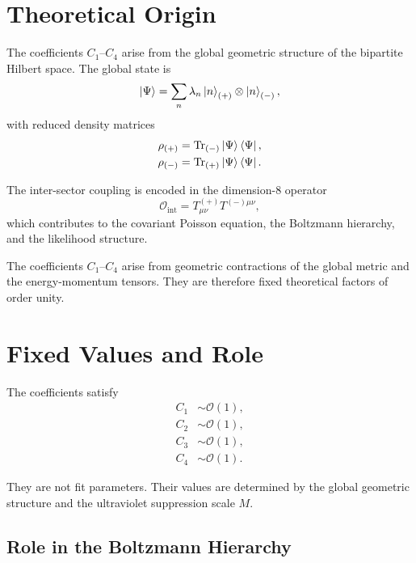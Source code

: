 \documentclass[11pt,a4paper]{article}
\begin{document}
\section[Theoretical Origin]{Theoretical Origin}

The coefficients $C_1$–$C_4$ arise from the global geometric structure of the
bipartite Hilbert space. The global state is
\begin{equation}
\ket{\Psi} = \sum_n \lambda_n \ket{n}_{(+)} \otimes \ket{n}_{(-)},
\end{equation}
with reduced density matrices
\begin{align}
\rho_{(+)} &= \Tr_{(-)} \ket{\Psi}\bra{\Psi}, \\
\rho_{(-)} &= \Tr_{(+)} \ket{\Psi}\bra{\Psi}.
\end{align}

The inter-sector coupling is encoded in the dimension-8 operator
\begin{equation}
\mathcal{O}_{\mathrm{int}} = T^{(+)}_{\mu\nu} T^{(-)\mu\nu},
\end{equation}
which contributes to the covariant Poisson equation, the Boltzmann hierarchy,
and the likelihood structure.

The coefficients $C_1$–$C_4$ arise from geometric contractions of the global
metric and the energy-momentum tensors. They are therefore fixed theoretical
factors of order unity.

\section[Fixed Values and Role]{Fixed Values and Role}

The coefficients satisfy
\begin{align}
C_1 &\sim \mathcal{O}(1), \\
C_2 &\sim \mathcal{O}(1), \\
C_3 &\sim \mathcal{O}(1), \\
C_4 &\sim \mathcal{O}(1).
\end{align}

They are not fit parameters. Their values are determined by the global
geometric structure and the ultraviolet suppression scale $M$.
\subsection[Role in the Boltzmann Hierarchy]{Role in the Boltzmann Hierarchy}
\end{document}

